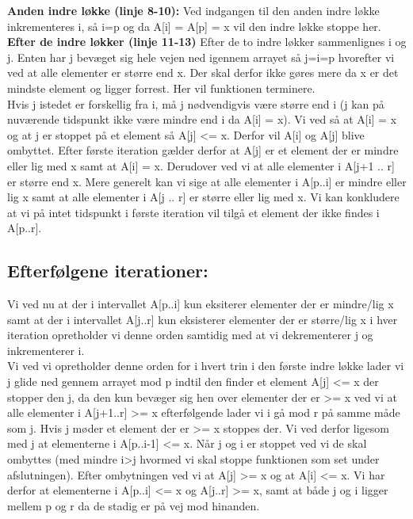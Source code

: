 \documentclass[10pt,a4paper,danish]{article}
\begin{document}
\textbf{Anden indre løkke (linje 8-10):}
Ved indgangen til den anden indre løkke inkrementeres i, så i=p og da A[i] = A[p] = x vil den indre løkke stoppe her.
\\

\textbf{Efter de indre løkker (linje 11-13)}
Efter de to indre løkker sammenlignes i og j.
Enten har j bevæget sig hele vejen ned igennem arrayet så j=i=p hvorefter vi ved at alle elementer er større end x. Der skal derfor ikke gøres mere da x er det mindste element og ligger forrest. Her vil funktionen terminere.
\\

Hvis j istedet er forskellig fra i, må j nødvendigvis være større end i (j kan på nuværende tidspunkt ikke være mindre end i da A[i] = x).
Vi ved så at A[i] = x og at j er stoppet på et element så A[j] <= x. Derfor vil A[i] og A[j] blive ombyttet.
Efter første iteration gælder derfor at A[j] er et element der er mindre eller lig med x samt at A[i] = x. Derudover ved vi at alle elementer i A[j+1 .. r] er større end x.
Mere generelt kan vi sige at alle elementer i A[p..i] er mindre eller lig x samt at alle elementer i A[j .. r] er større eller lig med x.
Vi kan konkludere at vi på intet tidspunkt i første iteration vil tilgå et element der ikke findes i A[p..r].


\subsection{Efterfølgene iterationer:}
\label{sec:eft-it}
Vi ved nu at der i intervallet A[p..i] kun eksiterer elementer der er mindre/lig x samt at der i intervallet A[j..r] kun eksisterer elementer der er større/lig x
i hver iteration opretholder vi denne orden samtidig med at vi dekrementerer j og inkrementerer i.
\\

Vi ved vi opretholder denne orden for i hvert trin i den første indre løkke lader vi j glide ned gennem arrayet mod p indtil den finder et element A[j] <= x der stopper den j, da den kun bevæger sig hen over elementer der er >= x ved vi at alle elementer i A[j+1..r] >= x
efterfølgende lader vi i gå mod r på samme måde som j. Hvis j møder et element der er >= x stoppes der. Vi ved derfor ligesom med j at elementerne i A[p..i-1] <= x. Når j og i er stoppet ved vi de skal ombyttes (med mindre  i>j hvormed vi skal stoppe funktionen som set under afslutningen). Efter ombytningen ved vi at A[j] >= x og at A[i] <= x. Vi har derfor at elementerne i A[p..i] <= x og A[j..r] >= x, samt at både j og i ligger mellem p og r da de stadig er på vej mod hinanden.
\end{document}
